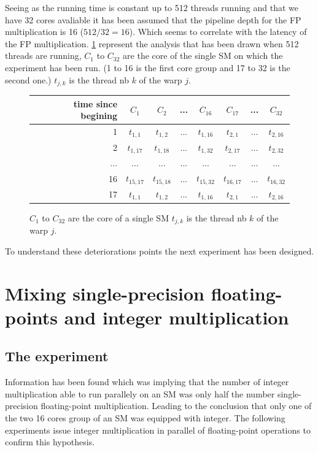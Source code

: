 \documentclass{article}
\begin{document}
    Seeing as the running time is constant up to 512 threads running and that we have 32 cores avaliable it has been assumed that the pipeline depth for the FP multiplication is 16 ($512/32 = 16$). Which seems to correlate with the latency of the FP multiplication.
    \ref{fig:fp_prediction_tabel} represent the analysis that has been drawn when 512 threads are running, $C_1$ to $C_{32}$ are the core of the single SM on which the experiment has been run. (1 to 16 is the first core group and 17 to 32 is the second one.) $t_{j,k}$ is the thread nb $k$ of the warp $j$. 
        \begin{figure}[h]
      \centering
       \begin{tabular}{ | r || c | c | c | c | c | c | c | }
    	    \hline
    	    time since begining & $C_1$ & $C_2$ & ... & $C_{16}$ & $C_{17}$ & ... & $C_{32}$ \\ \hline  \hline
    	   1 & $t_{1,1}$ & $t_{1,2}$ & ... & $t_{1,16}$ & $t_{2, 1}$ & ... & $t_{2, 16}$ \\ \hline 
    	   2 & $t_{1,17}$ & $t_{1,18}$ & ... & $t_{1,32}$ & $t_{2, 17}$ & ... & $t_{2, 32}$ \\ \hline
    	   ... & ... & ... & ... & ... & ... & ... & ... \\ \hline
    	   16 & $t_{15,17}$ & $t_{15,18}$ & ... & $t_{15,32}$ & $t_{16,17}$ & ... & $t_{16, 32}$ \\ \hline
    	   17 & $t_{1,1}$ & $t_{1,2}$ & ... & $t_{1,16}$ & $t_{2, 1}$ & ... & $t_{2, 16}$ \\ \hline
  	\end{tabular}
  	\captionsetup{justification=centering}
  	\caption{$C_1$ to $C_{32}$ are the core of a single SM \newline$t_{j,k}$ is the thread nb $k$ of the warp $j$.}
  	\label{fig:fp_prediction_tabel}
   \end{figure}

    To understand these deteriorations points the next experiment has been designed.

\section{Mixing single-precision floating-points and integer multiplication}
	\subsection{The experiment}
	Information has been found which was implying that the number of integer multiplication
    able to run parallely on an SM was only half the number single-precision floating-point
    multiplication. Leading to the conclusion that only one of the two 16 cores group of an
    SM was equipped with integer. The following experiments issue integer multiplication in
    parallel of floating-point operations to confirm this hypothesis.
\end{document}
